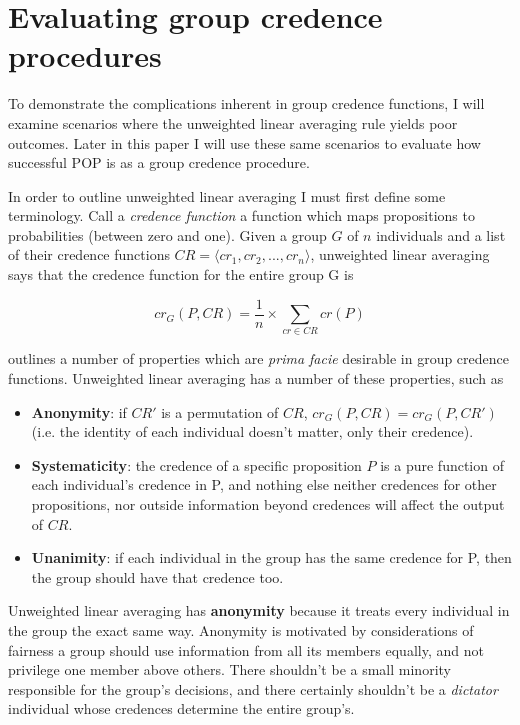 \documentclass{article}
\begin{document}
\section{Evaluating group credence procedures}

To demonstrate the complications inherent in group credence functions, I will examine scenarios where the unweighted linear averaging rule yields poor outcomes. Later in this paper I will use these same scenarios to evaluate how successful POP is as a group credence procedure.

In order to outline unweighted linear averaging I must first define some terminology. Call a \textit{credence function} a function which maps propositions to probabilities (between zero and one). Given a group \(G\) of \(n\) individuals and a list of their credence functions \(CR = \langle cr_1, cr_2, ..., cr_n\rangle\), unweighted linear averaging says that the credence function for the entire group G is 

\[cr_G(P,CR) = \frac{1}{n}\times\sum_{cr \in CR}cr(P)\]

\noindent 
\citet{russell2015groupthink} outlines a number of properties which are \textit{prima facie} desirable in group credence functions. Unweighted linear averaging has a number of these properties, such as 

\begin{itemize}
	\item \textbf{Anonymity}: if \(CR'\) is a permutation of \(CR\), \(cr_G(P, CR) = cr_G(P, CR')\) (i.e. the identity of each individual doesn't matter, only their credence).
	\item \textbf{Systematicity}: the credence of a specific proposition \(P\) is a pure function of each individual's credence in P, and nothing else \textemdash{} neither credences for other propositions, nor outside information beyond credences will affect the output of \(CR\).
	\item \textbf{Unanimity}: if each individual in the group has the same credence for P, then the group should have that credence too.
\end{itemize}

\noindent
Unweighted linear averaging has \textbf{anonymity} because it treats every individual in the group the exact same way. Anonymity is motivated by considerations of fairness \textemdash{} a group should use information from all its members equally, and not privilege one member above others. There shouldn't be a small minority responsible for the group's decisions, and there certainly shouldn't be a \textit{dictator} individual whose credences determine the entire group's.
\end{document}
